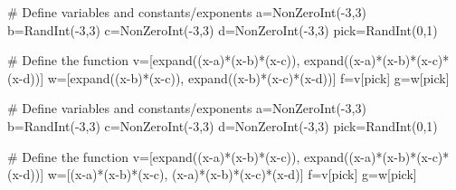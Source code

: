 
\begin{sagesilent}
# Define variables and constants/exponents
a=NonZeroInt(-3,3)
b=RandInt(-3,3)
c=NonZeroInt(-3,3)
d=NonZeroInt(-3,3)
pick=RandInt(0,1)

# Define the function
v=[expand((x-a)*(x-b)*(x-c)), expand((x-a)*(x-b)*(x-c)*(x-d))]
w=[expand((x-b)*(x-c)), expand((x-b)*(x-c)*(x-d))]
f=v[pick]
g=w[pick]

\end{sagesilent}
 

\begin{sagesilent}
# Define variables and constants/exponents
a=NonZeroInt(-3,3)
b=RandInt(-3,3)
c=NonZeroInt(-3,3)
d=NonZeroInt(-3,3)
pick=RandInt(0,1)

# Define the function
v=[expand((x-a)*(x-b)*(x-c)), expand((x-a)*(x-b)*(x-c)*(x-d))]
w=[(x-a)*(x-b)*(x-c), (x-a)*(x-b)*(x-c)*(x-d)]
f=v[pick]
g=w[pick]

\end{sagesilent}
 

